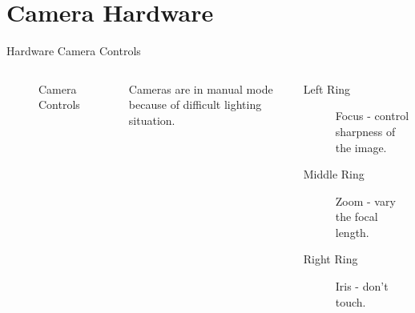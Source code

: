 \documentclass[aspectratio=169]{beamer}
\begin{document}
\section{Camera Hardware}
\begin{frame}{Hardware Camera Controls}
	\begin{columns}[T,onlytextwidth]
		\begin{figure} 
			\centering
			\caption{Camera Controls}
		\end{figure}
		Cameras are in manual mode because of difficult lighting situation.
		\begin{description}
			\item[Left Ring] Focus - control sharpness of the image.
			\item[Middle Ring] Zoom - vary the focal length.
			\item[Right Ring] Iris - don't touch.
		\end{description}
	\end{columns}
\end{frame}
\end{document}
